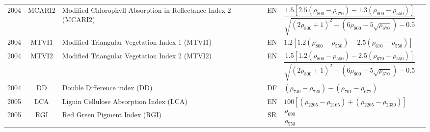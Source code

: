 \documentclass[10pt]{article}
\begin{document}
\begin{ThreePartTable}
\begin{longtable}{c c m{2.3in} c M{2.8in} M{1.5in}}
  2004 & MCARI2  & Modified Chlorophyll Absorption in Reflectance Index 2 (MCARI2)                & EN & $\dfrac{1.5[2.5(\rho_{800}-\rho_{670})-1.3(\rho_{800}-\rho_{550})]}{\sqrt{(2\rho_{800}+1)^2-(6\rho_{800}-5\sqrt{\rho_{670}})-0.5}}$                                                                                                                                                     & \citet{Haboudane2004}                               \\
  2004 & MTVI1   & Modified Triangular Vegetation Index 1 (MTVI1)                                 & EN & $1.2[1.2(\rho_{800}-\rho_{550})-2.5(\rho_{670}-\rho_{550})]$                                                                                                                                                                                                                            & \citet{Haboudane2004}                               \\
  2004 & MTVI2   & Modified Triangular Vegetation Index 2 (MTVI2)                                 & EN & $\dfrac{1.5[1.2(\rho_{800}-\rho_{550})-2.5(\rho_{670}-\rho_{550})]}{\sqrt{(2\rho_{800}+1)^2-(6\rho_{800}-5\sqrt{\rho_{670}})-0.5}}$                                                                                                                                                     & \citet{Haboudane2004}                               \\
  2004 & DD      & Double Difference index (DD)                                                   & DF & $(\rho_{749}-\rho_{720})-(\rho_{701}-\rho_{672})$                                                                                                                                                                                                                                       & \citet{LeMaire2004}                                 \\
  2005 & LCA     & Lignin Cellulose Absorption Index (LCA)                                        & EN & $100[(\rho_{2205} - \rho_{2165}) + (\rho_{2205} - \rho_{2330})]$                                                                                                                                                                                                                        & \citet{Daughtry2005}                                \\
  2005 & RGI     & Red Green Pigment Index (RGI)                                                  & SR & $\dfrac{\rho_{690}}{\rho_{550}}$                                                                                                                                                                                                                                                        & \citet{Zarco-Tejada2005}                            \\

\end{longtable}
\end{ThreePartTable}
\end{document}

